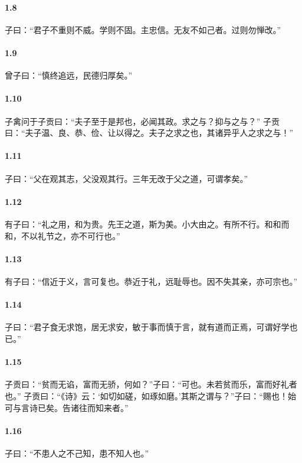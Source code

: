 \documentclass[main.tex]{subfiles}
\begin{document}
\paragraph{1.8}
子曰：“君子不重则不威。学则不固。主忠信。无友不如己者。过则勿惮改。”

\paragraph{1.9}
曾子曰：“慎终追远，民德归厚矣。”

\paragraph{1.10}
子禽问于子贡曰：“夫子至于是邦也，必闻其政。求之与？抑与之与？”
子贡曰：“夫子温、良、恭、俭、让以得之。夫子之求之也，其诸异乎人之求之与！”

\paragraph{1.11}
子曰：“父在观其志，父没观其行。三年无改于父之道，可谓孝矣。”

\paragraph{1.12}
有子曰：“礼之用，和为贵。先王之道，斯为美。小大由之。有所不行。和和而和，不以礼节之，亦不可行也。”

\paragraph{1.13}
有子曰：“信近于义，言可复也。恭近于礼，远耻辱也。因不失其亲，亦可宗也。”

\paragraph{1.14}
子曰：“君子食无求饱，居无求安，敏于事而慎于言，就有道而正焉，可谓好学也已。”

\paragraph{1.15}
子贡曰：“贫而无谄，富而无骄，何如？”子曰：“可也。未若贫而乐，富而好礼者也。”
子贡曰：“《诗》云：‘如切如磋，如琢如磨。’其斯之谓与？”子曰：“赐也！始可与言诗已矣。告诸往而知来者。”

\paragraph{1.16}
子曰：“不患人之不己知，患不知人也。”
\end{document}
